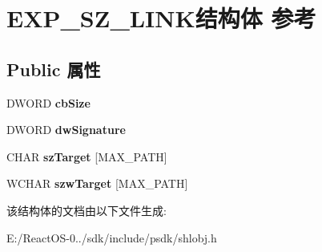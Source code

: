 \hypertarget{struct_e_x_p___s_z___l_i_n_k}{}\section{E\+X\+P\+\_\+\+S\+Z\+\_\+\+L\+I\+N\+K结构体 参考}
\label{struct_e_x_p___s_z___l_i_n_k}
\subsection*{Public 属性}
\begin{DoxyCompactItemize}
\item 
\mbox{\label{struct_e_x_p___s_z___l_i_n_k_a6d442dc57fb02a1d3cb2dc5f702e6fed}} 
D\+W\+O\+RD {\bfseries cb\+Size}
\item 
\mbox{\label{struct_e_x_p___s_z___l_i_n_k_a5ed507a6a725afa13070447b8e1876c3}} 
D\+W\+O\+RD {\bfseries dw\+Signature}
\item 
\mbox{\label{struct_e_x_p___s_z___l_i_n_k_aff220863b15c0f90aaa288c4eb939f40}} 
C\+H\+AR {\bfseries sz\+Target} \mbox{[}M\+A\+X\+\_\+\+P\+A\+TH\mbox{]}
\item 
\mbox{\label{struct_e_x_p___s_z___l_i_n_k_a6e2a9f3687a6a4659748bd29b90aa3c7}} 
W\+C\+H\+AR {\bfseries szw\+Target} \mbox{[}M\+A\+X\+\_\+\+P\+A\+TH\mbox{]}
\end{DoxyCompactItemize}


该结构体的文档由以下文件生成\+:\begin{DoxyCompactItemize}
\item 
E\+:/\+React\+O\+S-\/0../sdk/include/psdk/shlobj.\+h\end{DoxyCompactItemize}
